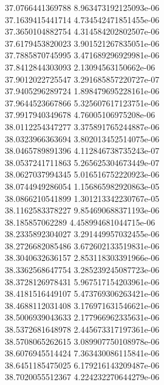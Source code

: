 {37.0766441369788 8.963473192125093e-06 \\
37.1639415441714 4.734542471851455e-06 \\
37.3650104882754 4.314584202802507e-06 \\
37.6179453820023 3.901521267835051e-06 \\
37.7885870745995 3.471689296929981e-06 \\
37.8412844303093 2.13094563150662e-06 \\
37.9012022725547 3.291685857220727e-07 \\
37.9405296289724 1.898479695228161e-06 \\
37.9644523667866 5.325607617123751e-06 \\
37.9917940349678 4.76005106975208e-06 \\
38.0112254347277 3.375891765244887e-06 \\
38.0323966363694 3.802013452514075e-06 \\
38.0465789891396 4.112846738735243e-07 \\
38.0537241711863 5.265625304673449e-07 \\
38.0627037994345 5.016516752220923e-06 \\
38.0744949286054 1.156865982920863e-05 \\
38.0866210541899 1.301213342230767e-05 \\
38.1162583378227 9.854690688371193e-06 \\
38.185857062289 4.458994681044715e-06 \\
38.2335892304027 3.291449957032455e-06 \\
38.2726682085486 3.672602133519831e-06 \\
38.3040632636157 2.853118303391966e-06 \\
38.3362568647754 3.285239245087723e-06 \\
38.3728126978431 5.967517154203961e-06 \\
38.4181516449107 5.473769306263421e-06 \\
38.4688112031408 3.176971631546621e-06 \\
38.5006939043633 2.177966962335631e-06 \\
38.5372681648978 2.445673317197361e-06 \\
38.5708065262615 3.089907750108978e-06 \\
38.6076945514424 7.363430086115841e-06 \\
38.6451185475025 6.179216143209487e-06 \\
38.7020055512367 4.224232270644279e-06 \\
}
